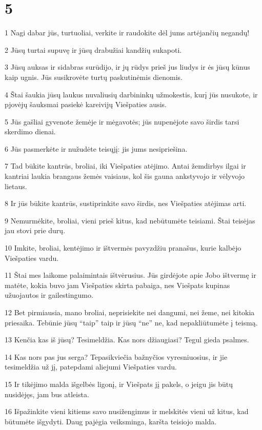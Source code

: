 \chapter{5}


\par 1 Nagi dabar jūs, turtuoliai, verkite ir raudokite dėl jums artėjančių negandų! 
\par 2 Jūsų turtai supuvę ir jūsų drabužiai kandžių sukapoti. 
\par 3 Jūsų auksas ir sidabras surūdijo, ir jų rūdys prieš jus liudys ir ės jūsų kūnus kaip ugnis. Jūs susikrovėte turtų paskutinėmis dienomis. 
\par 4 Štai šaukia jūsų laukus nuvaliusių darbininkų užmokestis, kurį jūs nusukote, ir pjovėjų šauksmai pasiekė kareivijų Viešpaties ausis. 
\par 5 Jūs gašliai gyvenote žemėje ir mėgavotės; jūs nupenėjote savo širdis tarsi skerdimo dienai. 
\par 6 Jūs pasmerkėte ir nužudėte teisųjį: jis jums nesipriešina. 
\par 7 Tad būkite kantrūs, broliai, iki Viešpaties atėjimo. Antai žemdirbys ilgai ir kantriai laukia brangaus žemės vaisiaus, kol šis gauna ankstyvojo ir vėlyvojo lietaus. 
\par 8 Ir jūs būkite kantrūs, sustiprinkite savo širdis, nes Viešpaties atėjimas arti. 
\par 9 Nemurmėkite, broliai, vieni prieš kitus, kad nebūtumėte teisiami. Štai teisėjas jau stovi prie durų. 
\par 10 Imkite, broliai, kentėjimo ir ištvermės pavyzdžiu pranašus, kurie kalbėjo Viešpaties vardu. 
\par 11 Štai mes laikome palaimintais ištvėrusius. Jūs girdėjote apie Jobo ištvermę ir matėte, kokia buvo jam Viešpaties skirta pabaiga, nes Viešpats kupinas užuojautos ir gailestingumo. 
\par 12 Bet pirmiausia, mano broliai, neprisiekite nei dangumi, nei žeme, nei kitokia priesaika. Tebūnie jūsų “taip”­ taip ir jūsų “ne”­ ne, kad nepakliūtumėte į teismą. 
\par 13 Kenčia kas iš jūsų? Tesimeldžia. Kas nors džiaugiasi? Tegul gieda psalmes. 
\par 14 Kas nors pas jus serga? Tepasikviečia bažnyčios vyresniuosius, ir jie tesimeldžia už jį, patepdami aliejumi Viešpaties vardu. 
\par 15 Ir tikėjimo malda išgelbės ligonį, ir Viešpats jį pakels, o jeigu jis būtų nusidėjęs, jam bus atleista. 
\par 16 Išpažinkite vieni kitiems savo nusižengimus ir melskitės vieni už kitus, kad būtumėte išgydyti. Daug pajėgia veiksminga, karšta teisiojo malda. 
